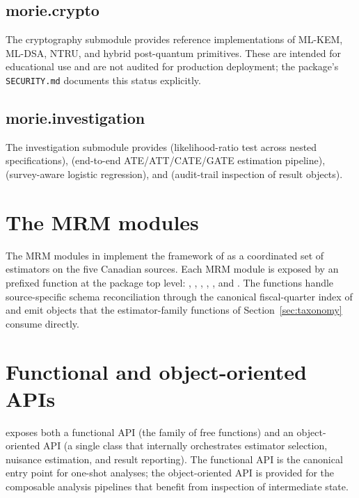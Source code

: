 \documentclass[article,shortnames,nojss]{jss}
\begin{document}
\subsection{morie.crypto}

The cryptography submodule provides reference implementations of
ML-KEM, ML-DSA, NTRU, and hybrid post-quantum primitives. These
are intended for educational use and are not audited for
production deployment; the package's \texttt{SECURITY.md}
documents this status explicitly.

\subsection{morie.investigation}

The investigation submodule provides
 (likelihood-ratio test
across nested specifications),
 (end-to-end
ATE/ATT/CATE/GATE estimation pipeline),
 (survey-aware logistic
regression), and  (audit-trail inspection
of result objects).

\section{The MRM modules}
\label{sec:mrm}

The MRM modules in  implement the framework of
\citet{Ruhela2026MRM} as a coordinated set of estimators on the
five Canadian sources. Each MRM module is exposed by an
 prefixed function at the package top level:
, ,
, ,
, and .
The functions handle source-specific schema reconciliation
through the canonical fiscal-quarter index of
\citet{Ruhela2026MRM} and emit  
objects that the estimator-family functions of
Section~\ref{sec:taxonomy} consume directly.

\section{Functional and object-oriented APIs}
\label{sec:api}

 exposes both a functional API (the
 family of free functions) and an
object-oriented API (a single  class that
internally orchestrates estimator selection, nuisance estimation,
and result reporting). The functional API is the canonical entry
point for one-shot analyses; the object-oriented API is provided
for the composable analysis pipelines that benefit from inspection
of intermediate state.
\end{document}
